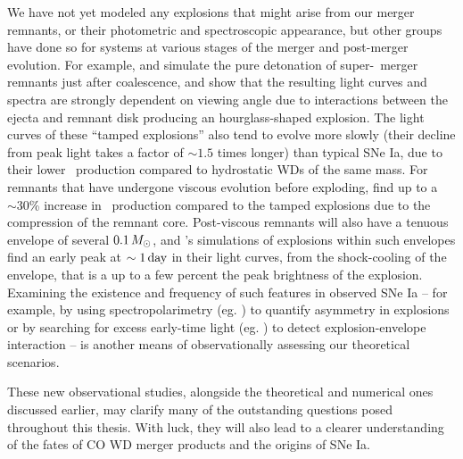 We have not yet modeled any explosions that might arise from our merger remnants, or their photometric and spectroscopic appearance, but other groups have done so for systems at various stages of the merger and post-merger evolution.  For example, \cite{rask+14} and \cite{vros+15} simulate the pure detonation of super-\Mch\ merger remnants just after coalescence, and show that the resulting light curves and spectra are strongly dependent on viewing angle due to interactions between the ejecta and remnant disk producing an hourglass-shaped explosion.  The light curves of these ``tamped explosions'' also tend to evolve more slowly (their decline from peak light takes a factor of $\sim1.5$ times longer) than typical SNe Ia, due to their lower \Ni\ production compared to hydrostatic WDs of the same mass.  For remnants that have undergone viscous evolution before exploding, \cite{rask+14} find up to a $\sim30$\% increase in \Ni\ production compared to the tamped explosions due to the compression of the remnant core.  Post-viscous remnants will also have a tenuous envelope of several $0.1\,\Msun$, and \cite{pirom15}'s simulations of explosions within such envelopes find an early peak at $\sim1\,\mathrm{day}$ in their light curves, from the shock-cooling of the envelope, that is a up to a few percent the peak brightness of the explosion. Examining the existence and frequency of such features in observed SNe Ia -- for example, by using spectropolarimetry (eg. \citealt{bullsk15}) to quantify asymmetry in explosions or by  searching for excess early-time light (eg. \citealt{mari+16}) to detect explosion-envelope interaction -- is another means of observationally assessing our theoretical scenarios.

These new observational studies, alongside the theoretical and numerical ones discussed earlier, may clarify many of the outstanding questions posed throughout this thesis.  With luck, they will also lead to a clearer understanding of the fates of CO WD merger products and the origins of SNe Ia.



